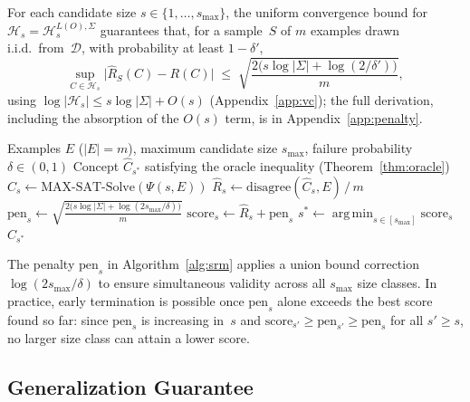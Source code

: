 \documentclass[accepted]{uai2026} %
\theoremstyle{definition}
\theoremstyle{remark}
\newcommand{\disagree}{\mathrm{disagree}}
\DeclareMathOperator*{\argmin}{arg\,min}
\begin{document}
For each candidate size $s \in \{1, \ldots, s_{\max}\}$,
the uniform convergence bound for $\mathcal{H}_s =
\mathcal{H}_{s}^{L(O),\Sigma}$ guarantees that,
for a sample~$S$ of $m$ examples drawn i.i.d.\
from~$\mathcal{D}$, with probability at
least $1 - \delta'$,
\begin{equation}\label{eq:uc}
  \sup_{C \in \mathcal{H}_s}
    \bigl| \hat{R}_S(C) - R(C) \bigr|
  \;\leq\;
  \sqrt{\frac{2\bigl(s \log|\Sigma| + \log(2/\delta')\bigr)}{m}},
\end{equation}
using $\log |\mathcal{H}_s| \leq s \log |\Sigma| + O(s)$
(Appendix~\ref{app:vc}); the full derivation,
including the absorption of the $O(s)$ term, is in
Appendix~\ref{app:penalty}.

\begin{algorithm}[t]
  \caption{SRM-MaxSAT}\label{alg:srm}
  \begin{algorithmic}[1]    \REQUIRE Examples $E$ ($|E| = m$), maximum
      candidate size $s_{\max}$,
      failure probability $\delta \in (0,1)$    \ENSURE Concept $\hat{C}_{s^*}$ satisfying the
      oracle inequality (Theorem~\ref{thm:oracle})
      \STATE $\hat{C}_s \leftarrow
        \text{MAX-SAT-Solve}(\Psi(s, E))$
        \hfill{}      \STATE $\hat{R}_s \leftarrow
        \disagree(\hat{C}_s, E) \,/\, m$
        \hfill{}
      \STATE $\mathrm{pen}_s \leftarrow
        \sqrt{\frac{2\bigl(s \log|\Sigma| +        \log(2 s_{\max}/\delta)\bigr)}{m}}$
        \hfill\COMMENT{penalty from~\eqref{eq:uc}}
      \STATE $\mathrm{score}_s \leftarrow
        \hat{R}_s + \mathrm{pen}_s$
    \ENDFOR    \STATE $s^* \leftarrow
      \argmin_{s \in [s_{\max}]} \mathrm{score}_s$
      \hfill{}
    \RETURN $\hat{C}_{s^*}$
  \end{algorithmic}
\end{algorithm}

The penalty
$\mathrm{pen}_s$ in Algorithm~\ref{alg:srm} applies a union bound
correction
$\log(2 s_{\max}/\delta)$ to ensure simultaneous validity across
all $s_{\max}$ size classes. In practice,
early termination is possible once $\mathrm{pen}_s$ alone exceeds
the best score found so far: since $\mathrm{pen}_s$ is increasing
in~$s$ and $\mathrm{score}_{s'} \geq \mathrm{pen}_{s'} \geq
\mathrm{pen}_s$ for all $s' \geq s$, no larger size class can
attain a lower score.

\subsection{Generalization Guarantee}\label{sec:algorithm:guarantee}
\end{document}
